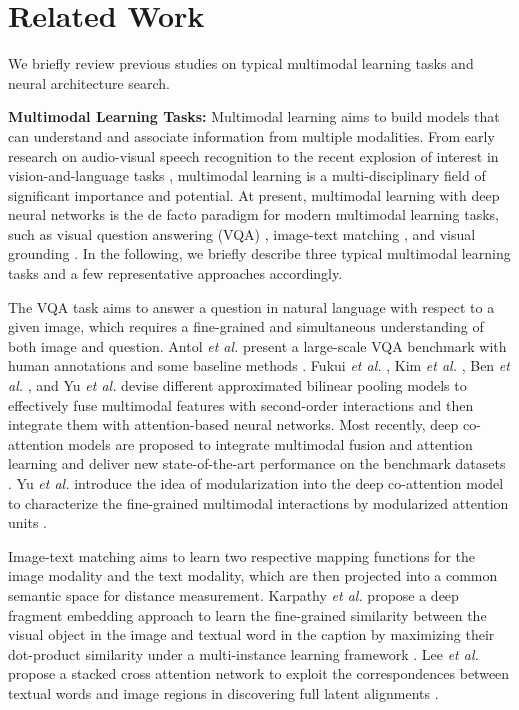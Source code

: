 \documentclass[sigconf]{acmart}
\begin{document}
\section{Related Work}
We briefly review previous studies on typical multimodal learning tasks and neural architecture search.

\noindent\textbf{Multimodal Learning Tasks:} Multimodal learning aims to build models that can understand and associate information from multiple modalities. From early research on audio-visual speech recognition \cite{yuhas1989integration, dupont2000audio} to the recent explosion of interest in vision-and-language tasks \cite{antol2015vqa, chen2015microsoft, yu2016modeling}, multimodal learning is a multi-disciplinary field of significant importance and potential. At present, multimodal learning with deep neural networks is the de facto paradigm for modern multimodal learning tasks, such as visual question answering (VQA) \cite{antol2015vqa}\cite{kim2018bilinear}\cite{yu2019mcan}, image-text matching \cite{karpathy2015deep, lee2018stacked}, and visual grounding \cite{yu2017joint}\cite{yu2018mattnet}. In the following, we briefly describe three typical multimodal learning tasks and a few representative approaches accordingly.

The VQA task aims to answer a question in natural language with respect to a given image, which requires a fine-grained and simultaneous understanding of both image and question. Antol \emph{et al.} present a large-scale VQA benchmark with human annotations and some baseline methods \cite{antol2015vqa}. Fukui \emph{et al.} \cite{fukui2016multimodal}, Kim \emph{et al.} \cite{kim2016hadamard}, Ben \emph{et al.} \cite{ben2017mutan}, and Yu \emph{et al.} \cite{yu2017mfb} devise different approximated bilinear pooling models to effectively fuse multimodal features with second-order interactions and then integrate them with attention-based neural networks. Most recently, deep co-attention models are proposed to integrate multimodal fusion and attention learning and deliver new state-of-the-art performance on the benchmark datasets \cite{nguyen2018improved,kim2018bilinear,gao2019dynamic}. Yu \emph{et al.} introduce the idea of modularization into the deep co-attention model to characterize the fine-grained multimodal interactions by modularized attention units \cite{yu2019mcan}.

Image-text matching aims to learn two respective mapping functions for the image modality and the text modality, which are then projected into a common semantic space for distance measurement. Karpathy \emph{et al.} propose a deep fragment embedding approach to learn the fine-grained similarity between the visual object in the image and textual word in the caption by maximizing their dot-product similarity under a multi-instance learning framework \cite{karpathy2015deep}. Lee \emph{et al.} propose a stacked cross attention network to exploit the correspondences between textual words and image regions in discovering full latent alignments \cite{lee2018stacked}.
\end{document}
